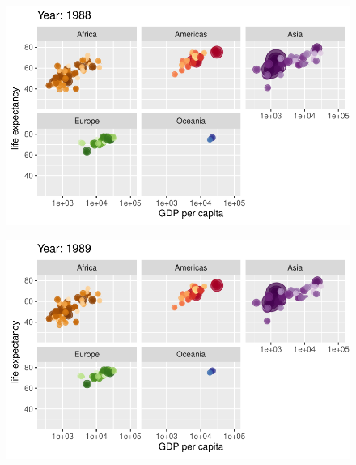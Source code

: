 \documentclass[
  letterpaper,
  DIV=11,
  numbers=noendperiod]{scrartcl}
\begin{document}
\begin{figure}[H]

{\centering \includegraphics{class05_files/figure-pdf/unnamed-chunk-24-66.pdf}

}

\end{figure}

\begin{figure}[H]

{\centering \includegraphics{class05_files/figure-pdf/unnamed-chunk-24-67.pdf}

}

\end{figure}
\end{document}

